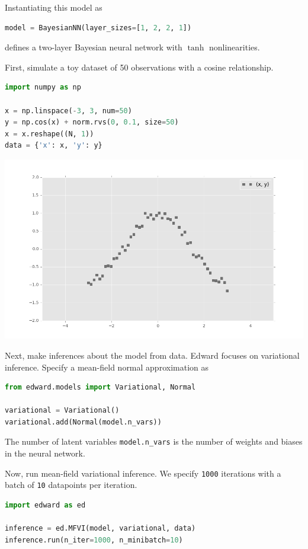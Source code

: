 Instantiating this model as
\begin{lstlisting}[language=Python]
model = BayesianNN(layer_sizes=[1, 2, 2, 1])
\end{lstlisting}
defines a two-layer Bayesian neural network with $\tanh$
nonlinearities.

First, simulate a toy dataset of 50 observations with a cosine relationship.
\begin{lstlisting}[language=Python]
import numpy as np

x = np.linspace(-3, 3, num=50)
y = np.cos(x) + norm.rvs(0, 0.1, size=50)
x = x.reshape((N, 1))
data = {'x': x, 'y': y}
\end{lstlisting}
\includegraphics[width=700px]{images/getting-started-fig0.png}

Next, make inferences about the model from data.
Edward focuses on variational inference. Specify a mean-field normal
approximation as
\begin{lstlisting}[language=Python]
from edward.models import Variational, Normal

variational = Variational()
variational.add(Normal(model.n_vars))
\end{lstlisting}
The number of latent variables \texttt{model.n_vars} is the number
of weights and biases in the neural network.

Now, run mean-field variational inference. We specify \texttt{1000} iterations
with a batch of \texttt{10} datapoints per iteration.
\begin{lstlisting}[language=Python]
import edward as ed

inference = ed.MFVI(model, variational, data)
inference.run(n_iter=1000, n_minibatch=10)
\end{lstlisting}

